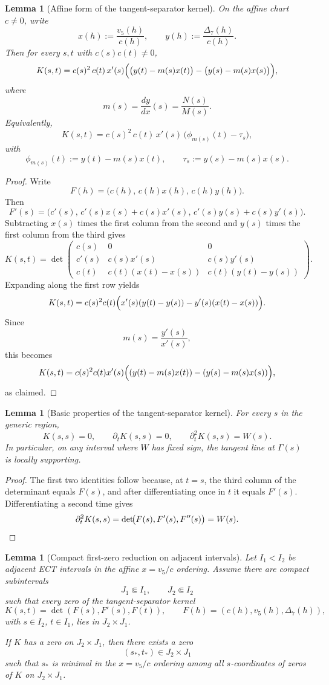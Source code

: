 \documentclass[11pt,a4paper]{amsart}
\theoremstyle{plain}
\newtheorem{lemma}[theorem]{Lemma}
\theoremstyle{definition}
\begin{document}
\begin{lemma}[Affine form of the tangent-separator kernel]
\label{lem:affine-form-of-K}
On the affine chart $c\neq 0$, write
\[
x(h):=\frac{v_5(h)}{c(h)},
\qquad
y(h):=\frac{\Delta_7(h)}{c(h)}.
\]
Then for every $s,t$ with $c(s)c(t)\neq 0$,
\[
K(s,t)
=
c(s)^2\,c(t)\,x'(s)
\Bigl(
\bigl(y(t)-m(s)x(t)\bigr)
-
\bigl(y(s)-m(s)x(s)\bigr)
\Bigr),
\]
where
\[
m(s)=\frac{dy}{dx}(s)=\frac{N(s)}{M(s)}.
\]
Equivalently,
\[
K(s,t)
=
c(s)^2\,c(t)\,x'(s)\,
\bigl(\phi_{m(s)}(t)-\tau_s\bigr),
\]
with
\[
\phi_{m(s)}(t):=y(t)-m(s)x(t),
\qquad
\tau_s:=y(s)-m(s)x(s).
\]
\end{lemma}

\begin{proof}
Write
\[
F(h)=\bigl(c(h),\,c(h)x(h),\,c(h)y(h)\bigr).
\]
Then
\[
F'(s)=\bigl(c'(s),\,c'(s)x(s)+c(s)x'(s),\,c'(s)y(s)+c(s)y'(s)\bigr).
\]
Subtracting $x(s)$ times the first column from the second and $y(s)$ times
the first column from the third gives
\[
K(s,t)
=
\det\!
\begin{pmatrix}
c(s) & 0 & 0\\
c'(s) & c(s)x'(s) & c(s)y'(s)\\
c(t) & c(t)(x(t)-x(s)) & c(t)(y(t)-y(s))
\end{pmatrix}.
\]
Expanding along the first row yields
\[
K(s,t)
=
c(s)^2c(t)\Bigl(x'(s)(y(t)-y(s))-y'(s)(x(t)-x(s))\Bigr).
\]
Since
\[
m(s)=\frac{y'(s)}{x'(s)},
\]
this becomes
\[
K(s,t)
=
c(s)^2c(t)x'(s)
\Bigl((y(t)-m(s)x(t))-(y(s)-m(s)x(s))\Bigr),
\]
as claimed.
\end{proof}

\begin{lemma}[Basic properties of the tangent-separator kernel]
\label{lem:tangent-separator-basic-properties}
For every $s$ in the generic region,
\[
K(s,s)=0,
\qquad
\partial_tK(s,s)=0,
\qquad
\partial_t^2K(s,s)=W(s).
\]
In particular, on any interval where $W$ has fixed sign, the tangent line at
$\Gamma(s)$ is locally supporting.
\end{lemma}

\begin{proof}
The first two identities follow because, at $t=s$, the third column of the
determinant equals $F(s)$, and after differentiating once in $t$ it equals
$F'(s)$. Differentiating a second time gives
\[
\partial_t^2K(s,s)=
\det\!\bigl(F(s),F'(s),F''(s)\bigr)=W(s).
\qedhere
\]
\end{proof}

\begin{lemma}[Compact first-zero reduction on adjacent intervals]
\label{lem:compact-first-zero-reduction}
Let $I_1<I_2$ be adjacent ECT intervals in the affine
$x=v_5/c$ ordering. Assume there are compact subintervals
\[
J_1\Subset I_1,\qquad J_2\Subset I_2
\]
such that every zero of the tangent-separator kernel
\[
K(s,t)=\det(F(s),F'(s),F(t)),
\qquad
F(h)=(c(h),v_5(h),\Delta_7(h)),
\]
with $s\in I_2$, $t\in I_1$, lies in $J_2\times J_1$.

If $K$ has a zero on $J_2\times J_1$, then there exists a zero
\[
(s_*,t_*)\in J_2\times J_1
\]
such that $s_*$ is minimal in the $x=v_5/c$ ordering among all
$s$-coordinates of zeros of $K$ on $J_2\times J_1$.
\end{lemma}
\end{document}
